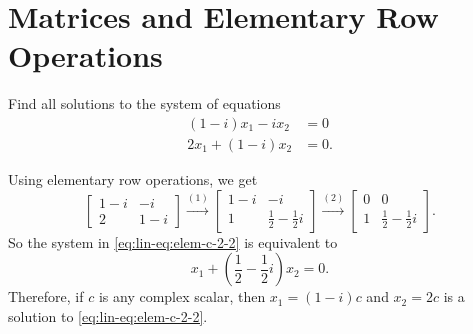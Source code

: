 \section{Matrices and Elementary Row Operations}

 Find all solutions to the system of equations
\begin{equation}
  \label{eq:lin-eq:elem-c-2-2}
  \begin{split}
    (1 - i)x_1 - ix_2 &= 0 \\
    2x_1 + (1 - i)x_2 &= 0.
  \end{split}
\end{equation}
\begin{solution}
  Using elementary row operations, we get
  \begin{equation*}
    \begin{bmatrix}
      1 - i & -i \\
      2 & 1 - i
    \end{bmatrix}
    \xrightarrow{(1)}
    \begin{bmatrix}
      1 - i & -i \\
      1 & \frac12 - \frac12i
    \end{bmatrix}
    \xrightarrow{(2)}
    \begin{bmatrix}
      0 & 0 \\
      1 & \frac12 - \frac12i
    \end{bmatrix}.
  \end{equation*}
  So the system in \eqref{eq:lin-eq:elem-c-2-2} is equivalent to
  \begin{equation*}
    x_1 + \left(\frac12 - \frac12i\right)x_2 = 0.
  \end{equation*}
  Therefore, if $c$ is any complex scalar, then $x_1 = (1 - i)c$ and
  $x_2 = 2c$ is a solution to \eqref{eq:lin-eq:elem-c-2-2}.
\end{solution}

